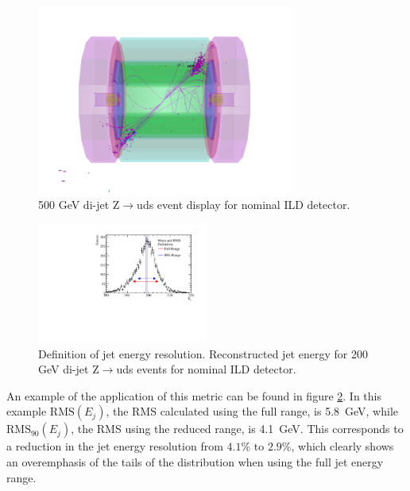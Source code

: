 \begin{figure}[h!]
\centering
\includegraphics[width=0.75\textwidth]{OptimisationStudies/Plots/MethodDescription/500GeVEvent.png}
\caption[500 GeV di-jet Z$\rightarrow$uds event display for nominal ILD detector.]{500 GeV di-jet Z$\rightarrow$uds event display for nominal ILD detector.}
\label{fig:500GeVzudsevtdisplay}
\end{figure} 

\begin{figure}[h!]
\centering
\includegraphics[width=0.5\textwidth]{OptimisationStudies/Plots/MethodDescription/RMS90Plot.pdf}
\caption[Definition of jet energy resolution.   Reconstructed jet energy for 200 GeV di-jet Z$\rightarrow$uds events for nominal ILD detector.]{Definition of jet energy resolution.   Reconstructed jet energy for 200 GeV di-jet Z$\rightarrow$uds events for nominal ILD detector.}
\label{fig:rms90defintion}
\end{figure} 

An example of the application of this metric can be found in figure \ref{fig:rms90defintion}.  In this example $\text{RMS}(E_{j})$, the RMS calculated using the full range, is 5.8~GeV, while $\text{RMS}_{90}(E_{j})$, the RMS using the reduced range, is 4.1~GeV.  This corresponds to a reduction in the jet energy resolution from $4.1\%$ to $2.9\%$, which clearly shows an overemphasis of the tails of the distribution when using the full jet energy range.

